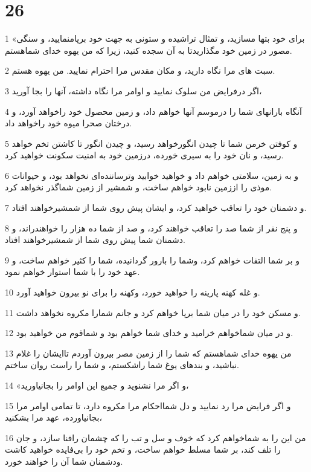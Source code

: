 \chapter{26}

\par 1 «برای خود بتها مسازید، و تمثال تراشیده و ستونی به جهت خود برپامنمایید، و سنگی مصور در زمین خود مگذاریدتا به آن سجده کنید، زیرا که من یهوه خدای شماهستم.
\par 2 سبت های مرا نگاه دارید، و مکان مقدس مرا احترام نمایید. من یهوه هستم.
\par 3 اگر درفرایض من سلوک نمایید و اوامر مرا نگاه داشته، آنها را بجا آورید، 
\par 4 آنگاه بارانهای شما را درموسم آنها خواهم داد، و زمین محصول خود راخواهد آورد، و درختان صحرا میوه خود راخواهد داد.
\par 5 و کوفتن خرمن شما تا چیدن انگورخواهد رسید، و چیدن انگور تا کاشتن تخم خواهد رسید، و نان خود را به سیری خورده، درزمین خود به امنیت سکونت خواهید کرد.
\par 6 و به زمین، سلامتی خواهم داد و خواهید خوابید وترساننده‌ای نخواهد بود، و حیوانات موذی را اززمین نابود خواهم ساخت، و شمشیر از زمین شماگذر نخواهد کرد.
\par 7 و دشمنان خود را تعاقب خواهید کرد، و ایشان پیش روی شما از شمشیرخواهند افتاد.
\par 8 و پنج نفر از شما صد را تعاقب خواهند کرد، و صد از شما ده هزار را خواهندراند، و دشمنان شما پیش روی شما از شمشیرخواهند افتاد.
\par 9 و بر شما التفات خواهم کرد، وشما را بارور گردانیده، شما را کثیر خواهم ساخت، و عهد خود را با شما استوار خواهم نمود.
\par 10 و غله کهنه پارینه را خواهید خورد، وکهنه را برای نو بیرون خواهید آورد.
\par 11 و مسکن خود را در میان شما برپا خواهم کرد و جانم شمارا مکروه نخواهد داشت.
\par 12 و در میان شماخواهم خرامید و خدای شما خواهم بود و شماقوم من خواهید بود.
\par 13 من یهوه خدای شماهستم که شما را از زمین مصر بیرون آوردم تاایشان را غلام نباشید، و بندهای یوغ شما راشکستم، و شما را راست روان ساختم.
\par 14 «و اگر مرا نشنوید و جمیع این اوامر را بجانیاورید،
\par 15 و اگر فرایض مرا رد نمایید و دل شمااحکام مرا مکروه دارد، تا تمامی اوامر مرا بجانیاورده، عهد مرا بشکنید،
\par 16 من این را به شماخواهم کرد که خوف و سل و تب را که چشمان رافنا سازد، و جان را تلف کند، بر شما مسلط خواهم ساخت، و تخم خود را بی‌فایده خواهید کاشت ودشمنان شما آن را خواهند خورد.
